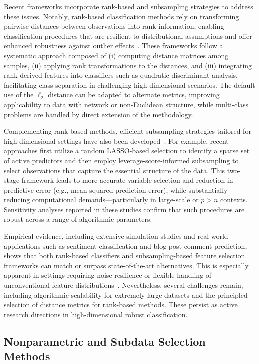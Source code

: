 \documentclass[sigconf]{acmart}
\begin{document}
Recent frameworks incorporate rank-based and subsampling strategies to address these issues. Notably, rank-based classification methods rely on transforming pairwise distances between observations into rank information, enabling classification procedures that are resilient to distributional assumptions and offer enhanced robustness against outlier effects~\cite{ref103}. These frameworks follow a systematic approach composed of (i) computing distance matrices among samples, (ii) applying rank transformations to the distances, and (iii) integrating rank-derived features into classifiers such as quadratic discriminant analysis, facilitating class separation in challenging high-dimensional scenarios. The default use of the $\ell_2$ distance can be adapted to alternate metrics, improving applicability to data with network or non-Euclidean structure, while multi-class problems are handled by direct extension of the methodology.

Complementing rank-based methods, efficient subsampling strategies tailored for high-dimensional settings have also been developed~\cite{ref102}. For example, recent approaches first utilize a random LASSO-based selection to identify a sparse set of active predictors and then employ leverage-score-informed subsampling to select observations that capture the essential structure of the data. This two-stage framework leads to more accurate variable selection and reduction in predictive error (e.g., mean squared prediction error), while substantially reducing computational demands—particularly in large-scale or $p > n$ contexts. Sensitivity analyses reported in these studies confirm that such procedures are robust across a range of algorithmic parameters.

Empirical evidence, including extensive simulation studies and real-world applications such as sentiment classification and blog post comment prediction, shows that both rank-based classifiers and subsampling-based feature selection frameworks can match or surpass state-of-the-art alternatives. This is especially apparent in settings requiring noise resilience or flexible handling of unconventional feature distributions~\cite{ref102,ref103}. Nevertheless, several challenges remain, including algorithmic scalability for extremely large datasets and the principled selection of distance metrics for rank-based methods. These persist as active research directions in high-dimensional robust classification.

\subsection{Nonparametric and Subdata Selection Methods}
\end{document}
